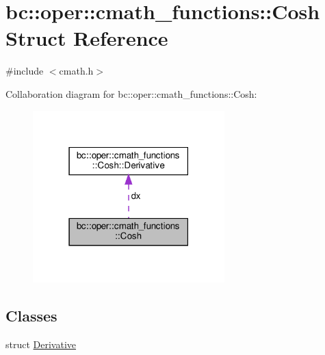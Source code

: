 \hypertarget{structbc_1_1oper_1_1cmath__functions_1_1Cosh}{}\section{bc\+:\+:oper\+:\+:cmath\+\_\+functions\+:\+:Cosh Struct Reference}
\label{structbc_1_1oper_1_1cmath__functions_1_1Cosh}


{\ttfamily \#include $<$cmath.\+h$>$}



Collaboration diagram for bc\+:\+:oper\+:\+:cmath\+\_\+functions\+:\+:Cosh\+:\nopagebreak
\begin{figure}[H]
\begin{center}
\leavevmode
\includegraphics[width=210pt]{structbc_1_1oper_1_1cmath__functions_1_1Cosh__coll__graph}
\end{center}
\end{figure}
\subsection*{Classes}
\begin{DoxyCompactItemize}
\item 
struct \hyperlink{structbc_1_1oper_1_1cmath__functions_1_1Cosh_1_1Derivative}{Derivative}
\end{DoxyCompactItemize}
